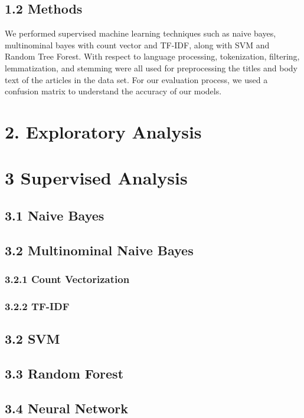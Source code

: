 \documentclass{neu_handout}
\begin{document}
\subsection*{1.2 Methods}
We performed supervised machine learning techniques such as naive bayes, multinominal bayes with count vector and TF-IDF, along with SVM and Random Tree Forest. With respect to language processing, tokenization, filtering, lemmatization, and stemming were all used for preprocessing the titles and body text of the articles in the data set. For our evaluation process, we used a confusion matrix to understand the accuracy of our models.

\section*{2. Exploratory Analysis}


\section*{3 Supervised Analysis}
\subsection*{3.1 Naive Bayes}

\subsection*{3.2 Multinominal Naive Bayes}

\subsubsection*{3.2.1 Count Vectorization}


\subsubsection*{3.2.2 TF-IDF}


\subsection*{3.2 SVM}

\subsection*{3.3 Random Forest}
 
 
\subsection*{3.4 Neural Network}
\end{document}
